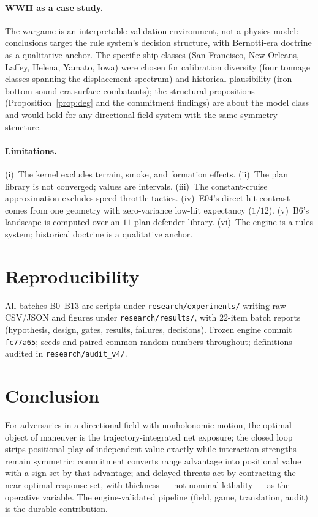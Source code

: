 \documentclass[12pt,a4paper]{article}
\begin{document}
\paragraph{WWII as a case study.}  The wargame is an interpretable
validation environment, not a physics model: conclusions target the rule
system's decision structure, with Bernotti-era doctrine as a qualitative
anchor.  The specific ship classes (San Francisco, New Orleans, Laffey,
Helena, Yamato, Iowa) were chosen for calibration diversity (four tonnage
classes spanning the displacement spectrum) and historical plausibility
(iron-bottom-sound-era surface combatants); the structural propositions
(Proposition~\ref{prop:deg} and the commitment findings) are about the
model class and would hold for any directional-field system with the same
symmetry structure.

\paragraph{Limitations.}  (i)~The kernel excludes terrain, smoke, and
formation effects.  (ii)~The plan library is not converged; values are
intervals.  (iii)~The constant-cruise approximation excludes
speed-throttle tactics.  (iv)~E04's direct-hit contrast comes from one
geometry with zero-variance low-hit expectancy ($1/12$).  (v)~B6's
landscape is computed over an $11$-plan defender library.  (vi)~The
engine is a rules system; historical doctrine is a qualitative anchor.

\section{Reproducibility}\label{sec:repro}
All batches B0--B13 are scripts under \texttt{research/experiments/}
writing raw CSV/JSON and figures under \texttt{research/results/}, with
$22$-item batch reports (hypothesis, design, gates, results, failures,
decisions).  Frozen engine commit \texttt{fc77a65}; seeds and paired
common random numbers throughout; definitions audited in
\texttt{research/audit\_v4/}.

\section{Conclusion}
For adversaries in a directional field with nonholonomic motion, the
optimal object of maneuver is the trajectory-integrated net exposure; the
closed loop strips positional play of independent value exactly while
interaction strengths remain symmetric; commitment converts range
advantage into positional value with a sign set by that advantage; and
delayed threats act by contracting the near-optimal response set, with
thickness --- not nominal lethality --- as the operative variable.  The
engine-validated pipeline (field, game, translation, audit) is the
durable contribution.
\end{document}
